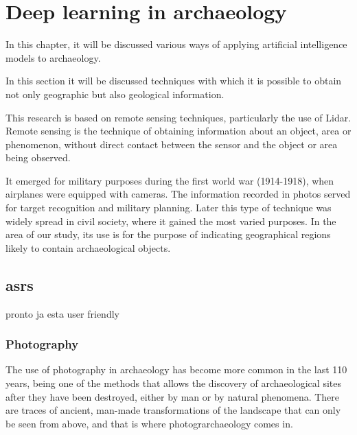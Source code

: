

\chapter{Deep learning in archaeology}

\begin{introduction}
In this chapter, it will be discussed various ways of applying artificial intelligence models to archaeology.
\end{introduction}
In this section it will be discussed techniques with which it is possible to obtain not only geographic but also geological information. 

This research is based on remote sensing techniques, particularly the use of Lidar. 
Remote sensing is the technique of obtaining information about an object, area or phenomenon, without direct contact between the sensor and the object or area being observed.

It emerged for military purposes during the first world war (1914-1918), when airplanes were equipped with cameras. The information recorded in photos served for target recognition and military planning.
Later this type of technique was widely spread in civil society, where it gained the most varied purposes. In the area of our study, its use is for the purpose of indicating geographical regions likely to contain archaeological objects.



\section{asrs}
pronto ja esta user friendly
\clearpage
\subsection{Photography}
The use of photography in archaeology has become more common in the last 110 years, being one of the methods that allows the discovery of archaeological sites after they have been destroyed, either by man or by natural phenomena. 
There are traces of ancient, man-made transformations of the landscape that can only be seen from above, and that is where photograrchaeology comes in.

